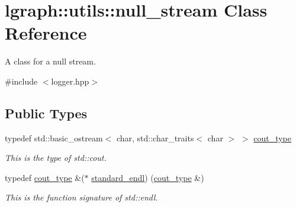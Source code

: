 \hypertarget{classlgraph_1_1utils_1_1null__stream}{}\section{lgraph\+:\+:utils\+:\+:null\+\_\+stream Class Reference}
\label{classlgraph_1_1utils_1_1null__stream}


A class for a null stream.  




{\ttfamily \#include $<$logger.\+hpp$>$}

\subsection*{Public Types}
\begin{DoxyCompactItemize}
\item 
\mbox{\label{classlgraph_1_1utils_1_1null__stream_ae3f818cbd342cb6da9f15677252da938}} 
typedef std\+::basic\+\_\+ostream$<$ char, std\+::char\+\_\+traits$<$ char $>$ $>$ \hyperlink{classlgraph_1_1utils_1_1null__stream_ae3f818cbd342cb6da9f15677252da938}{cout\+\_\+type}
\begin{DoxyCompactList}\small\item\em This is the type of std\+::cout. \end{DoxyCompactList}\item 
\mbox{\label{classlgraph_1_1utils_1_1null__stream_ada7be393792a0f7b90452c981a279d08}} 
typedef \hyperlink{classlgraph_1_1utils_1_1null__stream_ae3f818cbd342cb6da9f15677252da938}{cout\+\_\+type} \&($\ast$ \hyperlink{classlgraph_1_1utils_1_1null__stream_ada7be393792a0f7b90452c981a279d08}{standard\+\_\+endl}) (\hyperlink{classlgraph_1_1utils_1_1null__stream_ae3f818cbd342cb6da9f15677252da938}{cout\+\_\+type} \&)
\begin{DoxyCompactList}\small\item\em This is the function signature of std\+::endl. \end{DoxyCompactList}\end{DoxyCompactItemize}
